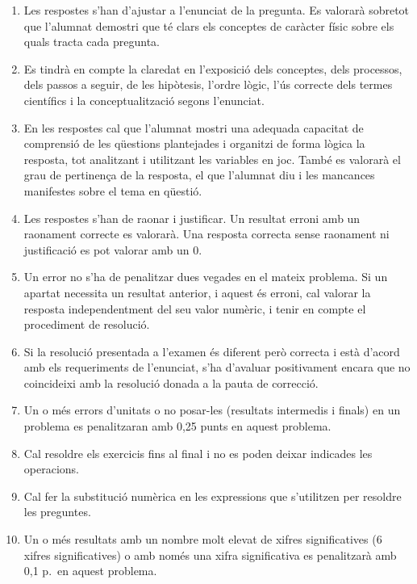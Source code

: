 \begin{enumerate}
  \item Les respostes s'han d'ajustar a l'enunciat de la pregunta. Es valorarà sobretot que l'alumnat demostri que té clars els conceptes de caràcter físic sobre els quals tracta cada pregunta.
  \item Es tindrà en compte la claredat en l'exposició dels conceptes, dels processos, dels passos a seguir, de les hipòtesis, l'ordre lògic, l'ús correcte dels termes científics i la conceptualització segons l'enunciat.
  \item En les respostes cal que l'alumnat mostri una adequada capacitat de comprensió de les qüestions plantejades i organitzi de forma lògica la resposta, tot analitzant i utilitzant les variables en joc. També es valorarà el grau de pertinença de la resposta, el que l'alumnat diu i les mancances manifestes sobre el tema en qüestió.
  \item Les respostes s'han de raonar i justificar. Un resultat erroni amb un raonament correcte es valorarà. Una resposta correcta sense raonament ni justificació es pot valorar amb un 0.
  \item Un error no s'ha de penalitzar dues vegades en el mateix problema. Si un apartat necessita un resultat anterior, i aquest és erroni, cal valorar la resposta independentment del seu valor numèric, i tenir en compte el procediment de resolució.
  \item Si la resolució presentada a l'examen és diferent però correcta i està d'acord amb els requeriments de l'enunciat, s'ha d'avaluar positivament encara que no coincideixi amb la resolució donada a la pauta de correcció.
  \item Un o més errors d'unitats o no posar-les (resultats intermedis i finals) en un problema es penalitzaran amb 0,25 punts en aquest problema.
  \item Cal resoldre els exercicis fins al final i no es poden deixar indicades les operacions.
  \item Cal fer la substitució numèrica en les expressions que s'utilitzen per resoldre les preguntes.
  \item Un o més resultats amb un nombre molt elevat de xifres significatives (6 xifres significatives) o amb només una xifra significativa es penalitzarà amb 0,1 p.\ en aquest problema.
\end{enumerate}
